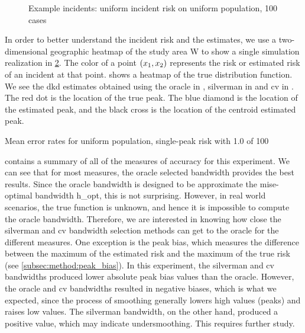 \begin{figure}[htbp]
\begin{subfigure}[b]{0.45\textwidth}
        \label{fig:cases_heatmap:unif_100_1.0_1h:cv}
    \end{subfigure}
    \caption[Example incidents: uniform incident risk on uniform population, 100 cases]
        {Example incidents: uniform incident risk on uniform population, 100 cases}
    \label{fig:cases_heatmap:unif_100_1.0_1h}
\end{figure}

In order to better understand the incident risk and the estimates,
we use a two-dimensional geographic heatmap of the study area \gls{W} to show a single simulation realization in
\cref{fig:cases_heatmap:unif_100_1.0_1h}.
The color of a point $(x_1, x_2)$ represents the risk or estimated risk of an incident at that point.
 shows a heatmap of the true distribution function.
We see the \gls{dkd} estimates obtained using the \gls{oracle} in ,
\gls{silverman} in  and \gls{cv} in .
The red dot is the location of the true peak.
The blue diamond is the location of the estimated peak,
and the black cross is the location of the centroid estimated peak.

\begin{table}[htbp]
    \centering
    
    \caption{Mean error rates for uniform population, single-peak risk with  1.0 of  100}
    \label{tab:errors:unif_100_1.0_1h}
\end{table}

 contains a summary of all of the measures of accuracy for this experiment.
We can see that for most measures, the \gls{oracle} selected bandwidth provides the best results.
Since the \gls{oracle} bandwidth is designed to be approximate the \gls{mise}-optimal bandwidth \gls{h_opt},
this is not surprising.
However, in real world scenarios, the true function is unknown, and hence it is impossible to compute the \gls{oracle} bandwidth.
Therefore, we are interested in knowing how close the \gls{silverman} and \gls{cv} bandwidth selection methods can get to the \gls{oracle} for the different measures.
One exception is the \gls{peak bias}, which measures the difference between the maximum of the estimated risk and the maximum of the true risk (see \cref{subsec:method:peak_bias}).
In this experiment, the \gls{silverman} and \gls{cv} bandwidths produced lower absolute \gls{peak bias} values than the \gls{oracle}. 
However, the \gls{oracle} and \gls{cv} bandwidths resulted in negative biases,
which is what we expected,
since the process of smoothing generally lowers high values (peaks) and raises low values.
The \gls{silverman} bandwidth, on the other hand, produced a positive value,
which may indicate undersmoothing.
This requires further study.

